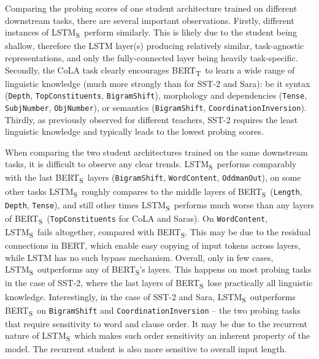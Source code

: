 \documentclass[bsc,frontabs,singlespacing,parskip,deptreport]{infthesis}
\def\BERTT{BERT\textsubscript{T}}
\def\BERTS{BERT\textsubscript{S}}
\def\LSTMS{LSTM\textsubscript{S}}
\begin{document}
{{{      %
      Comparing the probing scores of one student architecture trained on different downstream tasks, there are several important observations.
      Firstly, different instances of \LSTMS~perform similarly. This is likely due to the student being shallow, therefore the LSTM layer(s) producing relatively similar, task-agnostic representations, and only the fully-connected layer being heavily task-specific.
      Secondly, the CoLA task clearly encourages \BERTT~to learn a wide range of linguistic knowledge (much more strongly than for SST-2 and Sara): be it syntax (\verb|Depth|, \verb|TopConstituents|, \verb|BigramShift|), morphology and dependencies (\verb|Tense|, \verb|SubjNumber|, \verb|ObjNumber|), or semantics (\verb|BigramShift|, \verb|CoordinationInversion|).
      Thirdly, as previously observed for different teachers, SST-2 requires the least linguistic knowledge and typically leads to the lowest probing scores.

      When comparing the two student architectures trained on the same downstream tasks, it is difficult to observe any clear trends.
      \LSTMS~performs comparably with the last \BERTS~layers (\verb|BigramShift|, \verb|WordContent|, \verb|OddmanOut|), on some other tasks \LSTMS~roughly compares to the middle layers of \BERTS~(\verb|Length|, \verb|Depth|, \verb|Tense|), and still other times \LSTMS~performs much worse than any layers of \BERTS~(\verb|TopConstituents| for CoLA and Saras).
      On \verb|WordContent|, \LSTMS~fails altogether, compared with \BERTS. This may be due to the residual connections in BERT, which enable easy copying of input tokens across layers, while LSTM has no such bypass mechanism.
      Overall, only in few cases, \LSTMS~outperforms any of \BERTS's layers. This happens on most probing tasks in the case of SST-2, where the last layers of \BERTS~lose practically all linguistic knowledge.
      Interestingly, in the case of SST-2 and Sara, \LSTMS~outperforms \BERTS~on \verb|BigramShift| and \verb|CoordinationInversion| -- the two probing tasks that require sensitivity to word and clause order. It may be due to the recurrent nature of \LSTMS~which makes such order sensitivity an inherent property of the model. The recurrent student is also more sensitive to overall input length.

}}}
\end{document}
